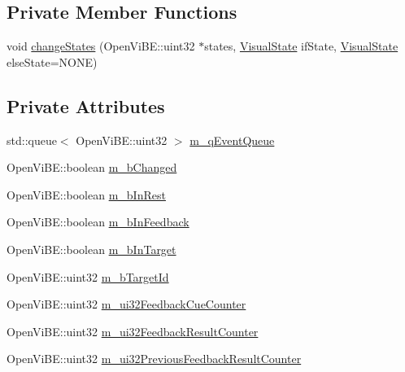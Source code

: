 \subsection*{Private Member Functions}
\begin{DoxyCompactItemize}
\item 
void \hyperlink{classOpenViBEApplications_1_1ExternalP300Visualiser_a82810be9f97e3c694ec4ac038ce4d228}{changeStates} (OpenViBE::uint32 $\ast$states, \hyperlink{ova__defines_8h_ac2575a0c79ceb4592555fa66f173dfc8}{VisualState} ifState, \hyperlink{ova__defines_8h_ac2575a0c79ceb4592555fa66f173dfc8}{VisualState} elseState=NONE)
\end{DoxyCompactItemize}
\subsection*{Private Attributes}
\begin{DoxyCompactItemize}
\item 
std::queue$<$ OpenViBE::uint32 $>$ \hyperlink{classOpenViBEApplications_1_1ExternalP300Visualiser_a04a821adef1b94191723146578ae3669}{m\_\-qEventQueue}
\item 
OpenViBE::boolean \hyperlink{classOpenViBEApplications_1_1ExternalP300Visualiser_a9a6a96e6b9464c6916f10bee02c80dde}{m\_\-bChanged}
\item 
OpenViBE::boolean \hyperlink{classOpenViBEApplications_1_1ExternalP300Visualiser_abcbcbeb679022145d362eccd0d783e98}{m\_\-bInRest}
\item 
OpenViBE::boolean \hyperlink{classOpenViBEApplications_1_1ExternalP300Visualiser_aba5f6c7b2a9021cd90a150fbc78e21d1}{m\_\-bInFeedback}
\item 
OpenViBE::boolean \hyperlink{classOpenViBEApplications_1_1ExternalP300Visualiser_a2062a6bab61a6764682e1ad904b50639}{m\_\-bInTarget}
\item 
OpenViBE::uint32 \hyperlink{classOpenViBEApplications_1_1ExternalP300Visualiser_a2b8102f008299c94ecafbd2f1609f105}{m\_\-bTargetId}
\item 
OpenViBE::uint32 \hyperlink{classOpenViBEApplications_1_1ExternalP300Visualiser_ad6e2d7401659d373523480531da643fa}{m\_\-ui32FeedbackCueCounter}
\item 
OpenViBE::uint32 \hyperlink{classOpenViBEApplications_1_1ExternalP300Visualiser_aa6239b87146df722ad2c69e3e25fb994}{m\_\-ui32FeedbackResultCounter}
\item 
OpenViBE::uint32 \hyperlink{classOpenViBEApplications_1_1ExternalP300Visualiser_a495ce12b0d23b6e6262e067557946375}{m\_\-ui32PreviousFeedbackResultCounter}
\end{DoxyCompactItemize}



